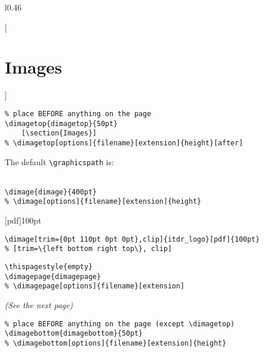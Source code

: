 \documentclass[itdr]{subfiles}
\begin{document}
\skipline
\lipsum[4]

\begin{wrap}[15]{l}{0.46\linewidth}
\end{wrap}

\skipline
\lipsum[5]

\vfill
\clearpage

[\section{Images}]


\faHandPointUp
\begin{lstlisting}
% place BEFORE anything on the page
\dimagetop{dimagetop}{50pt}
	[\section{Images}]
% \dimagetop[options]{filename}[extension]{height}[after]
\end{lstlisting}


\break

The default \lstinline!\graphicspath! is:\\
\\

\vspace{-0.5ex}
\begin{lstlisting}
\dimage{dimage}{400pt}
% \dimage[options]{filename}[extension]{height}
\end{lstlisting}
\faHandPointLeft

\vfill

[pdf]{100pt}
\faHandPointUp
\begin{lstlisting}
\dimage[trim={0pt 110pt 0pt 0pt},clip]{itdr_logo}[pdf]{100pt}
% [trim=\{left bottom right top\}, clip]
\end{lstlisting}

\vfill

\begin{lstlisting}
\thispagestyle{empty}
\dimagepage{dimagepage}
% \dimagepage[options]{filename}[extension]
\end{lstlisting}
{\em (See the next page)}\hfill\faHandPointRight

\vfill

\begin{lstlisting}
% place BEFORE anything on the page (except \dimagetop)
\dimagebottom{dimagebottom}{50pt}
% \dimagebottom[options]{filename}[extension]{height}
\end{lstlisting}
\faHandPointDown
\vspace{-3.5ex}

\break

\thispagestyle{empty}
\end{document}
